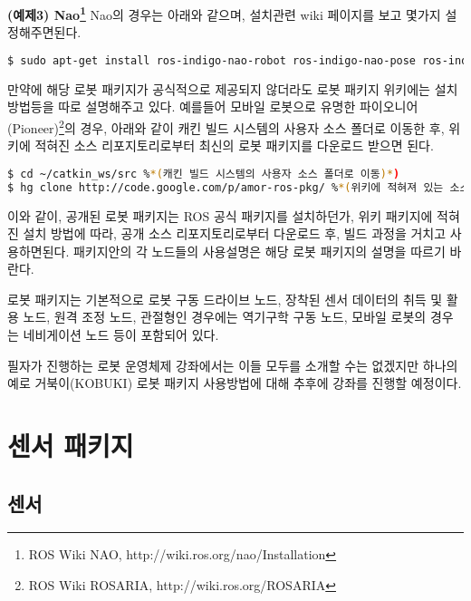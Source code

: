 \textbf{(예제3) Nao\footnote{ROS Wiki NAO, http://wiki.ros.org/nao/Installation}}
Nao의 경우는 아래와 같으며, 설치관련 wiki 페이지를 보고 몇가지 설정해주면된다.
\begin{lstlisting}[language=bash]
$ sudo apt-get install ros-indigo-nao-robot ros-indigo-nao-pose ros-indigo-nao-msgs ros-indigo-nao-driver ros-indigo-nao-description ros-indigo-nao-bringup ros-indigo-humanoid-nav-msg
\end{lstlisting}

만약에 해당 로봇 패키지가 공식적으로 제공되지 않더라도 로봇 패키지 위키에는 설치 방법등을 따로 설명해주고 있다. 예를들어 모바일 로봇으로 유명한 파이오니어(Pioneer)\footnote{ROS Wiki ROSARIA, http://wiki.ros.org/ROSARIA}의 경우, 아래와 같이 캐킨 빌드 시스템의 사용자 소스 폴더로 이동한 후, 위키에 적혀진 소스 리포지토리로부터 최신의 로봇 패키지를 다운로드 받으면 된다. 

\begin{lstlisting}[language=bash]
$ cd ~/catkin_ws/src %*(캐킨 빌드 시스템의 사용자 소스 폴더로 이동)*)
$ hg clone http://code.google.com/p/amor-ros-pkg/ %*(위키에 적혀져 있는 소스 리포지토리로부터 소스 다운로드)*)
\end{lstlisting}

이와 같이, 공개된 로봇 패키지는 ROS 공식 패키지를 설치하던가, 위키 패키지에 적혀진 설치 방법에 따라, 공개 소스 리포지토리로부터 다운로드 후, 빌드 과정을 거치고 사용하면된다. 패키지안의 각 노드들의 사용설명은 해당 로봇 패키지의 설명을 따르기 바란다.

로봇 패키지는 기본적으로 로봇 구동 드라이브 노드, 장착된 센서 데이터의 취득 및 활용 노드, 원격 조정 노드, 관절형인 경우에는 역기구학 구동 노드, 모바일 로봇의 경우는 네비게이션 노드 등이 포함되어 있다. 

필자가 진행하는 로봇 운영체제 강좌에서는 이들 모두를 소개할 수는 없겠지만 하나의 예로 거북이(KOBUKI) 로봇 패키지 사용방법에 대해 추후에 강좌를 진행할 예정이다.

\section{센서 패키지}

\subsection{센서}

